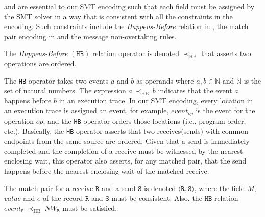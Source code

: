  and  are essential to our SMT encoding such that each field must be assigned by the SMT solver in a way that is consistent with all the constraints in the encoding. Such constraints include the \emph{Happens-Before} relation in , the match pair encoding in  and the message non-overtaking rules.

\begin{definition}
The \emph{Happens-Before} $(\mathtt{HB})$ relation operator is denoted $\mathrm{\prec_{HB}}$ that asserts two operations are ordered.
\label{def:hb}
\end{definition}

The \texttt{HB} operator takes two events $a$ and $b$ as operands where $a,b \in \mathbb{N}$ and $\mathbb{N}$ is the set of natural numbers. The expression $a\ \mathrm{\prec_{HB}}\ b$ indicates that the event $a$ happens before $b$ in an execution trace. In our SMT encoding, every location in an execution trace is assigned an event, for example, $\mathit{event}_{op}$ is the event for the operation $\mathit{op}$,  and the \texttt{HB} operator orders those locations (i.e., program order, etc.). Basically, the \texttt{HB} operator asserts that two receives(sends) with common endpoints from the same source are ordered. Given that a send is immediately completed and the completion of a receive must be witnessed  by the nearest-enclosing wait, this operator also asserts, for any matched pair, that the send happens before the nearest-enclosing wait of the matched receive.

\begin{definition}
The match pair for a receive $\mathtt{R}$ and a send $\mathtt{S}$ is denoted $\langle\mathtt{R}, \mathtt{S}\rangle$, where the field $M$, $value$ and $e$ of the record $\mathtt{R}$ and $\mathtt{S}$ must be consistent. Also, the $\mathtt{HB}$ relation $event_{\mathtt{S}}\ \mathrm{\prec_{HB}}\ NW_{\mathtt{R}}$ must be satisfied.
\label{def:match}
\end{definition}

